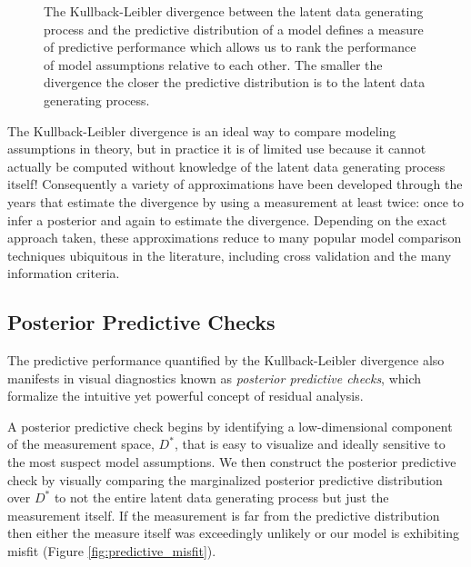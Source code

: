 \begin{figure*}
\centering
%
\caption{The Kullback-Leibler divergence between the
latent data generating process and the predictive distribution
of a model defines a measure of predictive performance which 
allows us to rank the performance of model assumptions relative
to each other.  The smaller the divergence the closer the predictive
distribution is to the latent data generating process.
}
\label{fig:predictive_performance}
\end{figure*}

The Kullback-Leibler divergence is an ideal way to compare 
modeling assumptions in theory, but in practice it is of limited
use because it cannot actually be computed without knowledge
of the latent data generating process itself!  Consequently a variety 
of approximations have been developed through the years that
estimate the divergence by using a measurement at least twice:
once to infer a posterior and again to estimate the divergence.
Depending on the exact approach taken, these approximations
reduce to many popular model comparison techniques ubiquitous 
in the literature, including cross validation and the many information 
criteria.

\subsection{Posterior Predictive Checks}

The predictive performance quantified by the Kullback-Leibler
divergence also manifests in visual diagnostics known as
\emph{posterior predictive checks}, which formalize the intuitive 
yet powerful concept of residual analysis. 

A posterior predictive check begins by identifying a low-dimensional
component of the measurement space, $D^{*}$, that is easy to 
visualize and ideally sensitive to the most suspect model 
assumptions.  We then construct the posterior predictive check by 
visually comparing the marginalized posterior predictive distribution 
over $D^{*}$ to not the entire latent data generating process but
just the measurement itself.  If the measurement is far from the 
predictive distribution then either the measure itself was exceedingly 
unlikely or our model is exhibiting misfit (Figure \ref{fig:predictive_misfit}).

